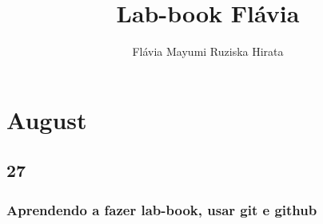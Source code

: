 \documentclass[a4paper, 12pt, titlepage]{report}
\title{Lab-book Flávia\\}
\author{Flávia Mayumi Ruziska Hirata }
\date{}
\begin{document}
\maketitle

\chapter{August}
\section{27}
\subsection{Aprendendo a fazer lab-book, usar git e github}
\printbibliography
\end{document}
